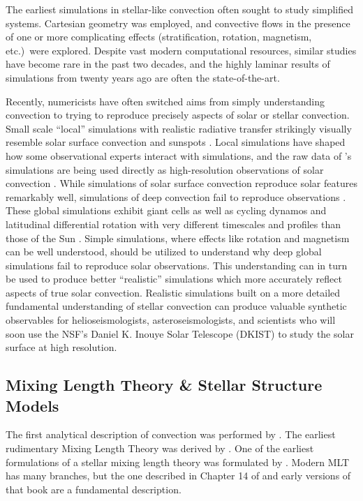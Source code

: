 The earliest simulations in stellar-like convection \citep{graham1975, hurlburt&all1984, cattaneo&all1991, brummell&all1996, brummell&all1998} often sought to study simplified systems.
Cartesian geometry was employed, and convective flows in the presence of one or more complicating effects (stratification, rotation, magnetism, etc.)~were explored.
Despite vast modern computational resources, similar studies \cite[e.g.,][]{wood&brummell2012, anders&brown2017, wood&brummell2018} have become rare in the past two decades, and the highly laminar results of simulations from twenty years ago are often the state-of-the-art.

Recently, numericists have often switched aims from simply understanding convection to trying to reproduce precisely aspects of solar or stellar convection.
Small scale ``local'' simulations with realistic radiative transfer strikingly visually resemble solar surface convection and sunspots \citep{stein&nordlund1998, rempel&all2009, stein&nordlund2012, rempel2014}.
Local simulations have shaped how some observational experts interact with simulations, and the raw data of \cite{rempel2014}'s simulations are being used directly as high-resolution observations of solar convection \cite[see e.g.,][and others]{vankooten&cranmer2017, shchukina&trujillo2019}.
While simulations of solar surface convection reproduce solar features remarkably well, simulations of deep convection fail to reproduce observations  \citep{hanasoge&all2015}.
These global simulations exhibit giant cells as well as cycling dynamos and latitudinal differential rotation with very different timescales and profiles than those of the Sun \citep{brown&all2010, brown&all2011, guerrero&all2016, hotta&all2016, brun&all2017, strugarek&all2018}.
Simple simulations, where effects like rotation and magnetism can be well understood, should be utilized to understand why deep global simulations fail to reproduce solar observations.
This understanding can in turn be used to produce better ``realistic'' simulations which more accurately reflect aspects of true solar convection.
Realistic simulations built on a more detailed fundamental understanding of stellar convection can produce valuable synthetic observables for helioseismologists, asteroseismologists, and scientists who will soon use the NSF's Daniel K. Inouye Solar Telescope (DKIST) to study the solar surface at high resolution.


\subsection{Mixing Length Theory \& Stellar Structure Models}
The first analytical description of convection was performed by \citet{rayleigh1916}.
The earliest rudimentary Mixing Length Theory was derived by \citet{prandtl1925}.
One of the earliest formulations of a stellar mixing length theory was formulated by \citet{bohm-vitense1958}.
Modern MLT has many branches, but the one described in Chapter 14 of \citet{weiss&all2004} and early versions of that book are a fundamental description.

